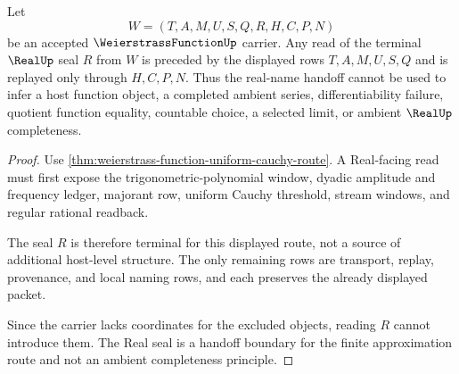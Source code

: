\begin{theorem}
\label{thm:weierstrass-function-real-seal-nonescape}
Let
$$
W=(T,A,M,U,S,Q,R,H,C,P,N)
$$
be an accepted $\WeierstrassFunctionUp$ carrier. Any read of the terminal $\RealUp$ seal $R$ from $W$ is preceded by the displayed rows $T,A,M,U,S,Q$ and is replayed only through $H,C,P,N$. Thus the real-name handoff cannot be used to infer a host function object, a completed ambient series, differentiability failure, quotient function equality, countable choice, a selected limit, or ambient $\RealUp$ completeness.
\end{theorem}
\begin{proof}
Use \autoref{thm:weierstrass-function-uniform-cauchy-route}. A Real-facing read must first expose the trigonometric-polynomial window, dyadic amplitude and frequency ledger, majorant row, uniform Cauchy threshold, stream windows, and regular rational readback.

The seal $R$ is therefore terminal for this displayed route, not a source of additional host-level structure. The only remaining rows are transport, replay, provenance, and local naming rows, and each preserves the already displayed packet.

Since the carrier lacks coordinates for the excluded objects, reading $R$ cannot introduce them. The Real seal is a handoff boundary for the finite approximation route and not an ambient completeness principle.
\end{proof}




